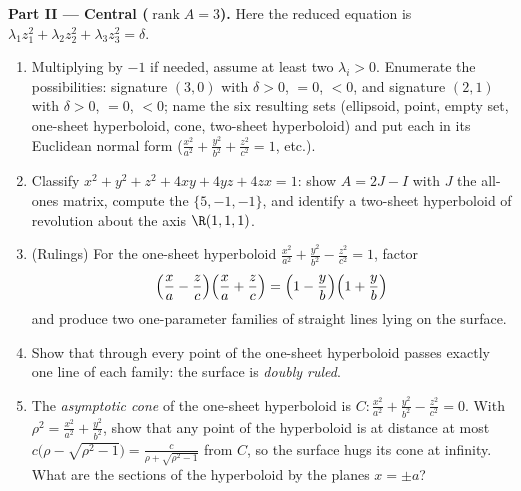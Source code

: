 \begin{problem}
\medskip
\noindent\textbf{Part II --- Central 
($\operatorname{rank}A = 3$).} Here the reduced equation is
$\lambda_1z_1^2 + \lambda_2z_2^2 + \lambda_3z_3^2 = \delta$.
\begin{enumerate}[resume]
  \item Multiplying by $-1$ if needed, assume at least two
        $\lambda_i > 0$. Enumerate the possibilities:
        signature $(3, 0)$ with $\delta > 0$, $= 0$, $< 0$,
        and signature $(2, 1)$ with $\delta > 0$, $= 0$, $<
        0$; name the six resulting sets (ellipsoid, point,
        empty set, one-sheet hyperboloid, cone, two-sheet
        hyperboloid) and put each in its Euclidean normal
        form ($\frac{x^2}{a^2} + \frac{y^2}{b^2} +
        \frac{z^2}{c^2} = 1$, etc.).
  \item Classify $x^2 + y^2 + z^2 + 4xy + 4yz + 4zx = 1$:
        show $A = 2J - I$ with $J$ the all-ones matrix,
        compute the  $\{5, -1, -1\}$, and identify a
        two-sheet hyperboloid of revolution about the axis
        $\R(1,1,1)$.
  \item (Rulings) For the one-sheet hyperboloid
        $\frac{x^2}{a^2} + \frac{y^2}{b^2} - \frac{z^2}{c^2}
        = 1$, factor
        \[
        \Bigl(\frac xa - \frac zc\Bigr)
        \Bigl(\frac xa + \frac zc\Bigr)
        = \Bigl(1 - \frac yb\Bigr)\Bigl(1 + \frac yb\Bigr)
        \]
        and produce two one-parameter families of straight
        lines lying on the surface.
  \item Show that through every point of the one-sheet
        hyperboloid passes exactly one line of each family:
        the surface is \emph{doubly ruled}.
  \item The \emph{asymptotic cone} of the one-sheet
        hyperboloid is $C : \frac{x^2}{a^2} + \frac{y^2}{b^2}
        - \frac{z^2}{c^2} = 0$. With $\rho^2 = \frac{x^2}{a^2}
        + \frac{y^2}{b^2}$, show that any point of the
        hyperboloid is at distance at most $c\bigl(\rho -
        \sqrt{\rho^2 - 1}\bigr) = \frac{c}{\rho +
        \sqrt{\rho^2 - 1}}$ from $C$, so the surface hugs its
        cone at infinity. What are the sections of the
        hyperboloid by the planes $x = \pm a$?
\end{enumerate}


\end{problem}
